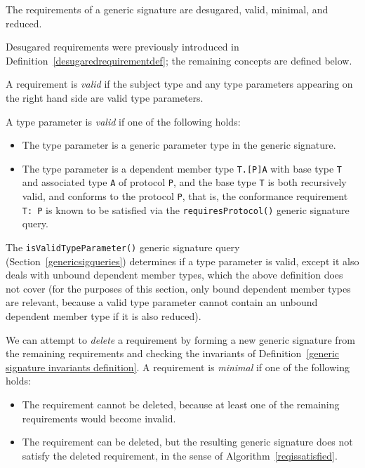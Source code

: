 \documentclass[../generics]{subfiles}
\begin{document}
\begin{definition}\label{generic signature invariants definition} The requirements of a generic signature are desugared, valid, minimal, and reduced.
\end{definition}

Desugared requirements were previously introduced in Definition~\ref{desugaredrequirementdef}; the remaining concepts are defined below.

\begin{definition}\label{valid type parameter}
A requirement is \emph{valid} if the subject type and any type parameters appearing on the right hand side are valid type parameters.
\end{definition}
\begin{definition} A type parameter is \emph{valid} if one of the following holds:
\begin{itemize}
\item The type parameter is a generic parameter type in the generic signature.
\item The type parameter is a dependent member type \texttt{T.[P]A} with base type \texttt{T} and associated type \texttt{A} of protocol \texttt{P}, and the base type \texttt{T} is both recursively valid, and conforms to the protocol \texttt{P}, that is, the conformance requirement \texttt{T:\ P} is known to be satisfied via the \texttt{requiresProtocol()} generic signature query.
\end{itemize}
The \texttt{isValidTypeParameter()} generic signature query (Section~\ref{genericsigqueries}) determines if a type parameter is valid, except it also deals with unbound dependent member types, which the above definition does not cover (for the purposes of this section, only bound dependent member types are relevant, because a valid type parameter cannot contain an unbound dependent member type if it is also reduced).
\end{definition}

\begin{definition} We can attempt to \emph{delete} a requirement by forming a new generic signature from the remaining requirements and checking the invariants of Definition~\ref{generic signature invariants definition}. A requirement is \emph{minimal} if one of the following holds:
\begin{itemize}
\item The requirement cannot be deleted, because at least one of the remaining requirements would become invalid.
\item The requirement can be deleted, but the resulting generic signature does not satisfy the deleted requirement, in the sense of Algorithm~\ref{reqissatisfied}.
\end{itemize}
\end{definition}
\end{document}
